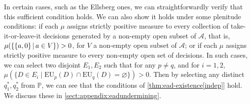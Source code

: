 \documentclass[a4paper]{article}
\newcommand\A{\mathcal{A}}
\renewcommand\P{\mathbb{P}} %
\newcommand\EU{\mathrm{EU}}
\newcommand{\IP}{\P}
\renewcommand{\color}[1]{}
\newenvironment{colored}[1]{\leavevmode\color{#1}}{}
\newcommand\SetDelimiter[1][]{
	\nonscript\,#1\vert \allowbreak \nonscript\,\mathopen{}}
\providecommand\given{\SetDelimiter}
\renewcommand{\emptyset}{\varnothing}
\newenvironment{CCM rewritten}
{\begingroup\color{blue}} %
{\endgroup}              %
\begin{document}
In certain cases, such as the Ellsberg ones, we  can straightforwardly verify that this sufficient condition holds. 
We can also show it holds under some plenitude conditions: if each $\mu$ assigns strictly positive measure to every collection of take-it-or-leave-it decisions generated by a non-empty open subset of $\A$, that is, $\mu(\{\{a,0\}\given a\in V\})>0$, for $V$ a non-empty open subset of $\A$; or if each $\mu$ assigns strictly positive measure to every non-empty open set of decisions. In such cases, we can select two disjoint $E_1,E_2$ such that for any $p\neq q$, and for $i = 1, 2$, $\mu(\{D\in E_i \mid \EU_p(D)\cap \EU_q(D)=\emptyset\})>0$. Then by selecting any distinct $q^*_1,q^*_2$ from $\IP$, we can see that the conditions of \cref{thm:ead-existence[indep]} hold. We discuss these in \cref{sect:appendix:eadundermining}.




\end{document}
